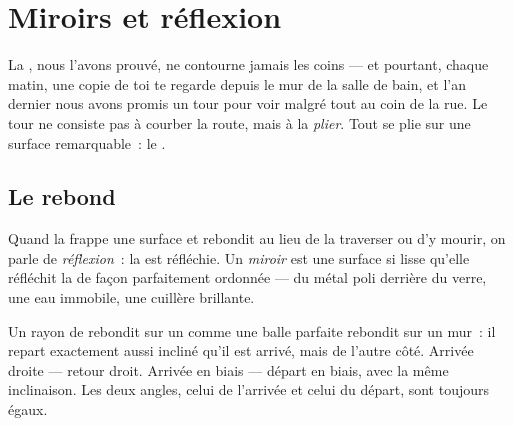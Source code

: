 \chapter{Miroirs et réflexion}\label{ch:g5:mirrors-reflection}

La , nous l'avons prouvé, ne contourne jamais les coins --- et
pourtant, chaque matin, une copie de toi te regarde depuis le mur de
la salle de bain, et l'an dernier nous avons promis un tour pour voir
malgré tout au coin de la rue. Le tour ne consiste pas à courber la
route, mais à la \emph{plier}. Tout se plie sur une surface
remarquable~: le .

\section{Le rebond}

\begin{definition}[Réflexion]\label{def:g5:mirrors-reflection:reflection}
Quand la  frappe une surface et rebondit au lieu de la
traverser ou d'y mourir, on parle de
\emph{réflexion}~: la  est réfléchie. Un
\emph{miroir} est une surface si lisse qu'elle
réfléchit la  de façon parfaitement ordonnée --- du métal poli
derrière du verre, une eau immobile, une cuillère brillante.
\end{definition}

\begin{proposition}\label{prop:g5:mirrors-reflection:bounce}
Un rayon de  rebondit sur un  comme une balle parfaite
rebondit sur un mur~: il repart exactement aussi incliné qu'il est
arrivé, mais de l'autre côté. Arrivée droite --- retour droit.
Arrivée en biais --- départ en biais, avec la même inclinaison. Les
deux angles, celui de l'arrivée et celui du départ, sont toujours
égaux.
\end{proposition}

